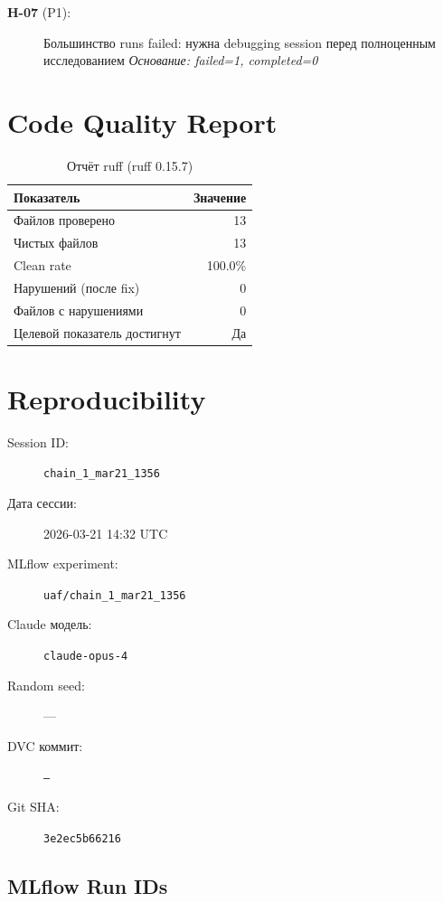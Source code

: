 \documentclass[12pt,a4paper]{article}
\begin{document}
\begin{description}
    \item[\textbf{H-07} (P1):] Большинство runs failed: нужна debugging session перед полноценным исследованием
    \textit{Основание: failed=1, completed=0}
\end{description}




\section{Code Quality Report}

\begin{table}[H]
\centering
\caption{Отчёт ruff (ruff 0.15.7)}
\begin{tabular}{lr}
\toprule
Показатель & Значение \\
\midrule
Файлов проверено & 13 \\
Чистых файлов & 13 \\
Clean rate & \textcolor{passcolor}{100.0\%} \\
Нарушений (после fix) & \textcolor{passcolor}{0} \\
Файлов с нарушениями & 0 \\
Целевой показатель достигнут & \textcolor{passcolor}{Да} \\
\bottomrule
\end{tabular}
\end{table}





\section{Reproducibility}

\begin{description}
    \item[Session ID:] \texttt{chain\_1\_mar21\_1356}
    \item[Дата сессии:] 2026-03-21 14:32 UTC
    \item[MLflow experiment:] \texttt{uaf/chain\_1\_mar21\_1356}
    \item[Claude модель:] \texttt{claude-opus-4}
    \item[Random seed:] ---
    \item[DVC коммит:] \texttt{---}
    \item[Git SHA:] \texttt{3e2ec5b66216}
\end{description}

\subsection*{MLflow Run IDs}
\end{document}
